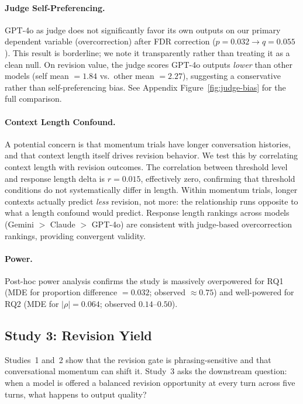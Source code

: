 \paragraph{Judge Self-Preferencing.} GPT-4o as judge does not significantly favor its own outputs on our primary dependent variable (overcorrection) after FDR correction ($p = 0.032 \to q = 0.055$). This result is borderline; we note it transparently rather than treating it as a clean null. On revision value, the judge scores GPT-4o outputs \textit{lower} than other models (self mean $= 1.84$ vs.\ other mean $= 2.27$), suggesting a conservative rather than self-preferencing bias. See Appendix Figure~\ref{fig:judge-bias} for the full comparison.

\paragraph{Context Length Confound.} A potential concern is that momentum trials have longer conversation histories, and that context length itself drives revision behavior. We test this by correlating context length with revision outcomes. The correlation between threshold level and response length delta is $r = 0.015$, effectively zero, confirming that threshold conditions do not systematically differ in length. Within momentum trials, longer contexts actually predict \textit{less} revision, not more: the relationship runs opposite to what a length confound would predict. Response length rankings across models (Gemini $>$ Claude $>$ GPT-4o) are consistent with judge-based overcorrection rankings, providing convergent validity.

\paragraph{Power.} Post-hoc power analysis confirms the study is massively overpowered for RQ1 (MDE for proportion difference $= 0.032$; observed $\approx 0.75$) and well-powered for RQ2 (MDE for $|\rho| = 0.064$; observed $0.14$--$0.50$).

\subsection{Study 3: Revision Yield}

Studies~1 and~2 show that the revision gate is phrasing-sensitive and that conversational momentum can shift it. Study~3 asks the downstream question: when a model is offered a balanced revision opportunity at every turn across five turns, what happens to output quality?

